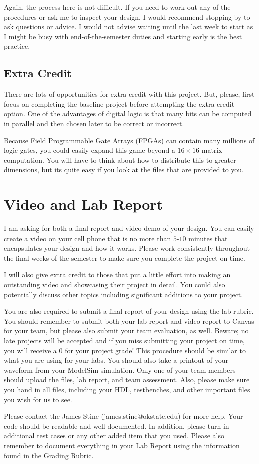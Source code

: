 \documentclass{article}
\begin{document}
Again, the process here is not difficult.  If you need to work out any
of the procedures or ask me to inspect your design, I would recommend
stopping by to ask questions or advice.  I would not advise waiting
until the last week to start as I might be busy with
end-of-the-semester duties and starting early is the best practice.

\subsection{Extra Credit}

There are lots of opportunities for extra credit with this project.
But, please, first focus on completing the baseline project before
attempting the extra credit option.  One of the advantages of digital
logic is that many bits can be computed in parallel and then chosen
later to be correct or incorrect.

Because Field Programmable Gate Arrays
(FPGAs) can contain many millions of logic gates, you could
easily expand this game beyond a $16 \times 16$ matrix computation.  You
will have to think about how to distribute this to greater dimensions,
but its quite easy if you look at the files that are provided to you.

\section{Video and Lab Report}

I am asking for
both a final report and video demo of your design.  You can easily
create a video on your cell phone that is no more than $5$-$10$ minutes
that encapsulates your design and how it works.  Please work
consistently throughout the final weeks of the semester to make sure
you complete the project on time.

I will also give extra credit to those that put a little effort into
making an outstanding video and showcasing their project in detail.
You could also potentially discuss other topics including significant
additions to your project.

You are also required to submit a final report of your design using
the lab rubric.  You should remember to submit both your lab report
and video report to Canvas for
your team, but please also submit your team evaluation, as well.
Beware; no
late projects will be accepted and if you miss submitting your project
on time, you will receive a $0$ for your project grade!  This
procedure should be similar to what you are using for your labs.
You should also take a printout of your waveform 
from your ModelSim simulation.  
Only one of your team members should upload
the files, lab report, and team assessment.  Also, please make sure you
hand in all files, including your HDL, testbenches, and other
important files you wish for us to see.

Please contact
the James Stine
(james.stine@okstate.edu) 
for more help.  Your
code should be
readable and well-documented. In addition, please turn in additional
test cases or any other added item that you used. 
Please also remember to document everything in your Lab Report using
the information found in the Grading Rubric.

   


\end{document}
